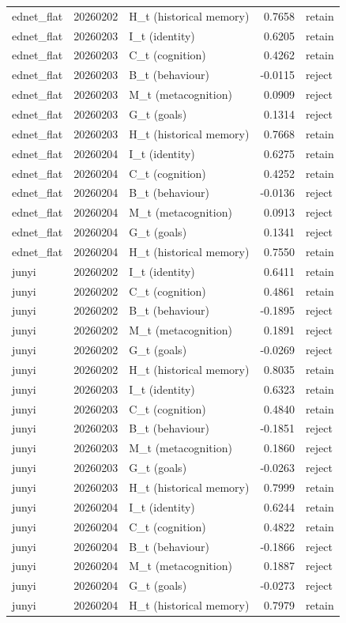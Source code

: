 \begin{tabular}{lrlrl}
ednet\_flat & 20260202 & H\_t (historical memory) & 0.7658 & retain \\
ednet\_flat & 20260203 & I\_t (identity) & 0.6205 & retain \\
ednet\_flat & 20260203 & C\_t (cognition) & 0.4262 & retain \\
ednet\_flat & 20260203 & B\_t (behaviour) & -0.0115 & reject \\
ednet\_flat & 20260203 & M\_t (metacognition) & 0.0909 & reject \\
ednet\_flat & 20260203 & G\_t (goals) & 0.1314 & reject \\
ednet\_flat & 20260203 & H\_t (historical memory) & 0.7668 & retain \\
ednet\_flat & 20260204 & I\_t (identity) & 0.6275 & retain \\
ednet\_flat & 20260204 & C\_t (cognition) & 0.4252 & retain \\
ednet\_flat & 20260204 & B\_t (behaviour) & -0.0136 & reject \\
ednet\_flat & 20260204 & M\_t (metacognition) & 0.0913 & reject \\
ednet\_flat & 20260204 & G\_t (goals) & 0.1341 & reject \\
ednet\_flat & 20260204 & H\_t (historical memory) & 0.7550 & retain \\
junyi & 20260202 & I\_t (identity) & 0.6411 & retain \\
junyi & 20260202 & C\_t (cognition) & 0.4861 & retain \\
junyi & 20260202 & B\_t (behaviour) & -0.1895 & reject \\
junyi & 20260202 & M\_t (metacognition) & 0.1891 & reject \\
junyi & 20260202 & G\_t (goals) & -0.0269 & reject \\
junyi & 20260202 & H\_t (historical memory) & 0.8035 & retain \\
junyi & 20260203 & I\_t (identity) & 0.6323 & retain \\
junyi & 20260203 & C\_t (cognition) & 0.4840 & retain \\
junyi & 20260203 & B\_t (behaviour) & -0.1851 & reject \\
junyi & 20260203 & M\_t (metacognition) & 0.1860 & reject \\
junyi & 20260203 & G\_t (goals) & -0.0263 & reject \\
junyi & 20260203 & H\_t (historical memory) & 0.7999 & retain \\
junyi & 20260204 & I\_t (identity) & 0.6244 & retain \\
junyi & 20260204 & C\_t (cognition) & 0.4822 & retain \\
junyi & 20260204 & B\_t (behaviour) & -0.1866 & reject \\
junyi & 20260204 & M\_t (metacognition) & 0.1887 & reject \\
junyi & 20260204 & G\_t (goals) & -0.0273 & reject \\
junyi & 20260204 & H\_t (historical memory) & 0.7979 & retain \\
\bottomrule
\end{tabular}
